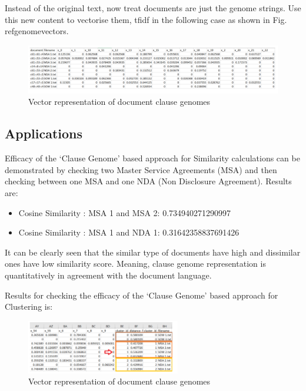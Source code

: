 \documentclass[9pt,academicons]{article}
\begin{document}
Instead of the original text, now treat documents are just the genome strings. Use this new content to vectorise them,  tfidf  in the following case as shown in Fig. ref{genomevectors}.

 \begin{figure}[h!]
 \begin{center}
  \includegraphics[width=\textwidth]{img/genomevectors.png}
  \caption{Vector representation of document clause genomes}
  \label{fig:genomevectors}
 \end{center}
 \end{figure}


\subsection{Applications}
\label{subsec:application}

Efficacy of the `Clause Genome' based approach for Similarity calculations can be demonstrated by checking two Master Service Agreements (MSA) and then checking between one MSA and one NDA (Non Disclosure Agreement). Results are:

 \begin{itemize}
 \item Cosine Similarity : MSA 1 and MSA 2: 0.734940271290997 
\item Cosine Similarity : MSA 1 and NDA 1: 0.31642358837691426 
\end{itemize}

It can be clearly seen that the similar type of documents have high and dissimilar ones have low similarity score. Meaning, clause genome
representation is quantitatively in agreement with the document language.

Results for checking the efficacy of the `Clause Genome' based approach for Clustering is:

 \begin{figure}[h!]
 \begin{center}
  \includegraphics[width=0.6\textwidth]{img/genomeclustering.png}
  \caption{Vector representation of document clause genomes}
  \label{fig:genomeclustering}
 \end{center}
 \end{figure}
 
\end{document}
